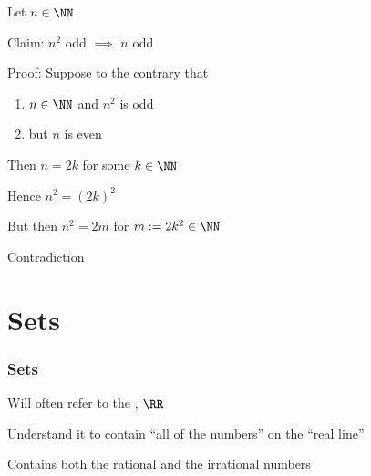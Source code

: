 \begin{frame}
    

    \Eg Let $n \in \NN$

    Claim: $n^2$ odd $\implies$ $n$ odd

    \vspace{1em}

    Proof: Suppose to the contrary that

    \begin{enumerate}
        \item $n \in \NN$ and $n^2$ is odd
        \item but $n$ is even
    \end{enumerate}
    

    Then $n = 2k$ for some $k \in \NN$

    Hence $n^2 = (2k)^2$ 

    But then $n^2 = 2m$ for $m := 2k^2 \in \NN$ 

    Contradiction

\end{frame}


\section{Sets}

\begin{frame}
    \frametitle{Sets}
    
    Will often refer to the ,  $\RR$


    \vspace{1em}
    
    Understand it to contain ``all of the numbers'' on the ``real line''

    \begin{figure}[h]
       \begin{center}
        \scalebox{.5}{}
       \end{center}
    \end{figure}

    \vspace{1em}

    Contains both the rational and the irrational numbers

    
\end{frame}


